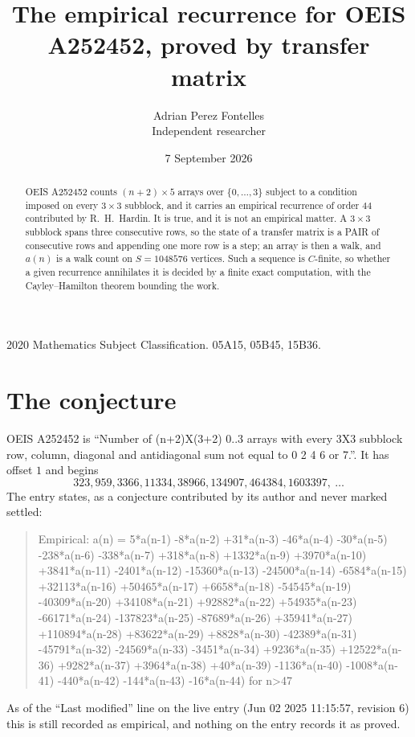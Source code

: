 \documentclass[11pt,a4paper]{article}
\title{The empirical recurrence for OEIS A252452, proved by transfer matrix}
\author{Adrian Perez Fontelles\\ \small Independent researcher}
\date{7 September 2026}
\theoremstyle{plain}
\theoremstyle{definition}
\begin{document}
\maketitle

\begin{abstract}
OEIS A252452 counts $(n+2)\times5$ arrays over $\{0,\dots,3\}$ subject to a condition imposed on
every $3\times3$ subblock, and it carries an empirical recurrence of order $44$
contributed by R.~H.~Hardin. It is true, and it is not an empirical matter. A $3\times3$
subblock spans three consecutive rows, so the state of a transfer matrix is a PAIR of
consecutive rows and appending one more row is a step; an array is then a walk, and
$a(n)$ is a walk count on $S=1048576$ vertices. Such a sequence is $C$-finite, so whether a given
recurrence annihilates it is decided by a finite exact computation, with the Cayley--Hamilton
theorem bounding the work.
\end{abstract}

\noindent\small 2020 Mathematics Subject Classification. 05A15, 05B45, 15B36.\normalsize

\section{The conjecture}

OEIS A252452 is ``Number of (n+2)X(3+2) 0..3 arrays with every 3X3 subblock row, column, diagonal and antidiagonal sum not equal to 0 2 4 6 or 7.''. It has offset $1$ and begins
\[
323, 959, 3366, 11334, 38966, 134907, 464384, 1603397,\ \dots
\]
The entry states, as a conjecture contributed by its author and never marked settled:
\begin{quote}
Empirical: a(n) = 5*a(n-1) -8*a(n-2) +31*a(n-3) -46*a(n-4) -30*a(n-5) -238*a(n-6) -338*a(n-7) +318*a(n-8) +1332*a(n-9) +3970*a(n-10) +3841*a(n-11) -2401*a(n-12) -15360*a(n-13) -24500*a(n-14) -6584*a(n-15) +32113*a(n-16) +50465*a(n-17) +6658*a(n-18) -54545*a(n-19) -40309*a(n-20) +34108*a(n-21) +92882*a(n-22) +54935*a(n-23) -66171*a(n-24) -137823*a(n-25) -87689*a(n-26) +35941*a(n-27) +110894*a(n-28) +83622*a(n-29) +8828*a(n-30) -42389*a(n-31) -45791*a(n-32) -24569*a(n-33) -3451*a(n-34) +9236*a(n-35) +12522*a(n-36) +9282*a(n-37) +3964*a(n-38) +40*a(n-39) -1136*a(n-40) -1008*a(n-41) -440*a(n-42) -144*a(n-43) -16*a(n-44) for n>47
\end{quote}
As of the ``Last modified'' line on the live entry (Jun 02 2025 11:15:57, revision 6) this is still
recorded as empirical, and nothing on the entry records it as proved.
\end{document}
